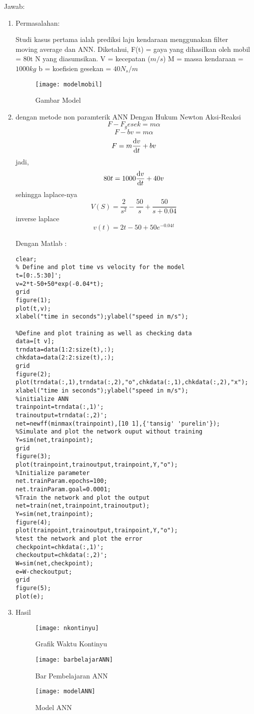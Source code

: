 \documentclass[10pt]{article}
\begin{document}
Jawab:
\begin{enumerate}
\item Permasalahan:

Studi kasus pertama ialah prediksi laju kendaraan menggunakan filter moving average dan ANN.
Diketahui,
F(t) = gaya yang dihasilkan oleh mobil = 80t N yang diasumsikan.
V = kecepatan ($m/s$)
M = massa kendaraan = $1000 kg$
b = koefisien gesekan = $40 N_s/m$
\begin{figure}
    \centering
    \texttt{[image: modelmobil]}
    \caption{Gambar Model}
\end{figure}
\item dengan metode non paramterik ANN
Dengan Hukum Newton Aksi-Reaksi
$$F-F_gesek=m\alpha$$
$$F-bv=m\alpha$$
$$F=m \dv{v}{t}+bv$$
jadi,
$$80t=1000 \dv{v}{t}+40v$$
sehingga laplace-nya
$$ V(S)=\frac{2}{s^2}-\frac{50}{s}+\frac{50}{s+0.04}$$
inverse laplace
$$ v(t)=2t-50+50e^{-0.04t} $$

Dengan Matlab :
\begin{verbatim}
clear;
% Define and plot time vs velocity for the model
t=[0:.5:30]';
v=2*t-50+50*exp(-0.04*t);
grid
figure(1);
plot(t,v);
xlabel("time in seconds");ylabel("speed in m/s");
 
%Define and plot training as well as checking data
data=[t v];
trndata=data(1:2:size(t),:);
chkdata=data(2:2:size(t),:);
grid
figure(2);
plot(trndata(:,1),trndata(:,2),"o",chkdata(:,1),chkdata(:,2),"x");
xlabel("time in seconds");ylabel("speed in m/s");
%initialize ANN
trainpoint=trndata(:,1)';
trainoutput=trndata(:,2)';
net=newff(minmax(trainpoint),[10 1],{'tansig' 'purelin'});
%Simulate and plot the network ouput without training
Y=sim(net,trainpoint);
grid
figure(3);
plot(trainpoint,trainoutput,trainpoint,Y,"o");
%Initialize parameter
net.trainParam.epochs=100;
net.trainParam.goal=0.0001;
%Train the network and plot the output
net=train(net,trainpoint,trainoutput);
Y=sim(net,trainpoint);
figure(4);
plot(trainpoint,trainoutput,trainpoint,Y,"o");
%test the network and plot the error
checkpoint=chkdata(:,1)';
checkoutput=chkdata(:,2)';
W=sim(net,checkpoint);
e=W-checkoutput;
grid
figure(5);
plot(e);
\end{verbatim}

\item Hasil
\begin{figure}[!htb]
    \centering
    \texttt{[image: nkontinyu]}
    \caption{Grafik Waktu Kontinyu}
\end{figure}

\begin{figure}[!htb]
    \centering
    \texttt{[image: barbelajarANN]}
    \caption{Bar Pembelajaran ANN}
\end{figure}

\begin{figure}[!htb]
    \centering
    \texttt{[image: modelANN]}
    \caption{Model ANN}
\end{figure}

\end{enumerate}
\end{document}
